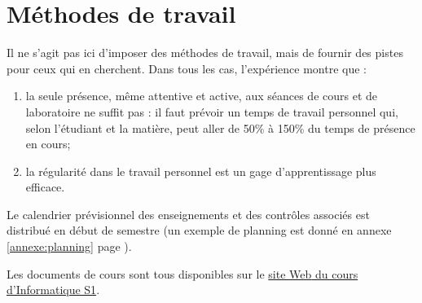\section{Méthodes de travail}
Il ne s'agit pas ici d'imposer des méthodes de travail, 
mais de fournir des pistes pour ceux qui en cherchent.
Dans tous les cas, l'expérience montre que :
\begin{enumerate}
\item la seule présence, même attentive et active, aux séances de cours 
	et de laboratoire ne suffit pas : il faut prévoir un temps de travail personnel
	qui, selon l'étudiant et la matière, peut aller de 50\% à 150\% du temps de 
	présence en cours;
\item la régularité dans le travail personnel est un gage d'apprentissage
	plus efficace.
\end{enumerate}
Le calendrier prévisionnel des enseignements et des contrôles associés
est distribué en début de semestre (un exemple de planning est donné
en annexe \ref{annexe:planning} page \pageref{annexe:planning}).

\noindent Les documents de cours sont tous disponibles 
sur le \href{https://moodle.enib.fr/course/view.php?id=24}{site {\sc Web} du cours d'Informatique S1}.

